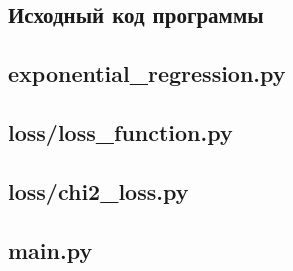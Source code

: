 \newcommand{\sectionset}{\centering\normalsize\normalfont\bfseries\expandafter\uppercase}
{}
\begin{appendices}
	\renewcommand{\thesection}{\Asbuk{section}}

	\newpage
	\section{Исходный код программы}

	\subsection{exponential\_regression.py}
	

	\newpage
	\subsection{loss/loss\_function.py}
	

	\newpage
	\subsection{loss/chi2\_loss.py}
	

	\newpage
	\subsection{main.py}
	

\end{appendices}

